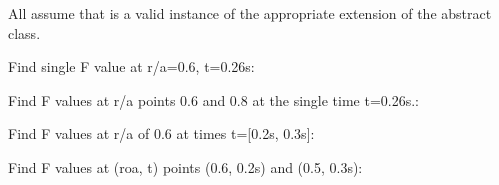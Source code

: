 \documentclass[letterpaper,10pt,english]{sphinxmanual}
\begin{document}
\begin{fulllineitems}
\begin{fulllineitems}
All assume that  is a valid instance of the appropriate
extension of the {\hyperref[\detokenize{eqtools:eqtools.core.Equilibrium}]{}} abstract class.

Find single F value at r/a=0.6, t=0.26s:

\begin{sphinxVerbatim}[commandchars=\\\{\}]
   
\end{sphinxVerbatim}

Find F values at r/a points 0.6 and 0.8 at the
single time t=0.26s.:

\begin{sphinxVerbatim}[commandchars=\\\{\}]
  \PYG{p}{[} \PYG{p}{]} 
\end{sphinxVerbatim}

Find F values at r/a of 0.6 at times t={[}0.2s, 0.3s{]}:

\begin{sphinxVerbatim}[commandchars=\\\{\}]
   \PYG{p}{[} \PYG{p}{]}
\end{sphinxVerbatim}

Find F values at (roa, t) points (0.6, 0.2s) and (0.5, 0.3s):

\begin{sphinxVerbatim}[commandchars=\\\{\}]
  \PYG{p}{[} \PYG{p}{]} \PYG{p}{[} \PYG{p}{]} 
\end{sphinxVerbatim}

\end{fulllineitems}



\end{fulllineitems}
\end{document}
